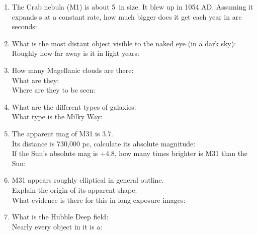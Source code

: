\documentclass[11pt]{article}
\begin{document}
\begin{enumerate}
\item 
The Crab nebula (M1) is about 5\arcmin\ in size. It blew up in 1054
AD. Assuming it expands s at a constant rate, how much bigger does it
get each year in arc seconds:


\item 
What is the most distant object visible to the naked eye (in a dark
sky): \\
Roughly how far away is it in light years:


\item 
How many Magellanic clouds are there: \\
What are they: \\
Where are they to be seen:


\item 
What are the different types of galaxies: \\
What type is the Milky Way:


\item 
The apparent mag of M31 is 3.7. \\
Its distance is 730,000 pc, calculate its absolute magnitude:\\
If the Sun's absolute mag is +4.8, how many times brighter is M31
than the Sun:


\item 
M31 appears roughly elliptical in general outline. \\
Explain the origin of its apparent shape: \\
What evidence is there for this in long exposure images:


\item 
What is the Hubble Deep field: \\
Nearly every object in it is a:


\end{enumerate} 
\end{document}
